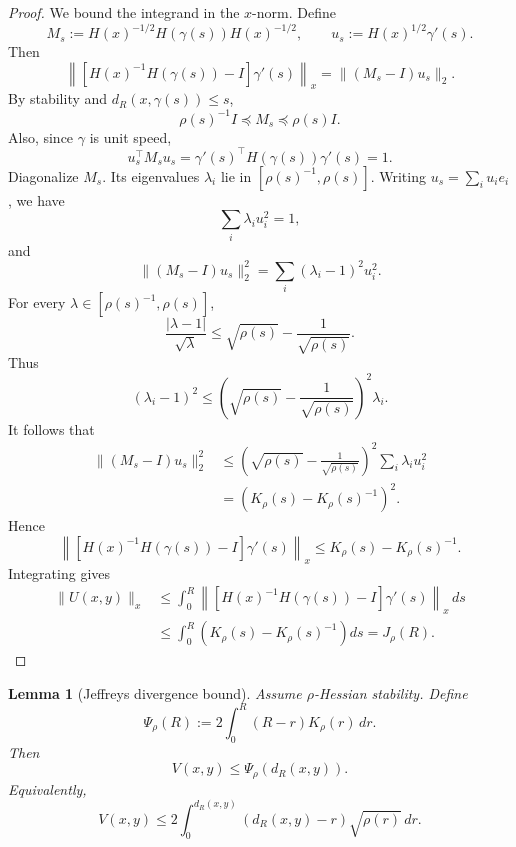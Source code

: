 \documentclass[11pt]{article}
\newtheorem{lemma}{Lemma}
\begin{document}
\begin{proof}
We bound the integrand in the \(x\)-norm. Define
\[
    M_s:=H(x)^{-1/2}H(\gamma(s))H(x)^{-1/2},
    \qquad
    u_s:=H(x)^{1/2}\gamma'(s).
\]
Then
\[
    \left\|
    \left[H(x)^{-1}H(\gamma(s))-I\right]\gamma'(s)
    \right\|_x
    =
    \|(M_s-I)u_s\|_2.
\]
By stability and \(d_R(x,\gamma(s))\le s\),
\[
    \rho(s)^{-1}I\preceq M_s\preceq \rho(s)I.
\]
Also, since \(\gamma\) is unit speed,
\[
    u_s^\top M_su_s
    =
    \gamma'(s)^\top H(\gamma(s))\gamma'(s)
    =1.
\]
Diagonalize \(M_s\). Its eigenvalues \(\lambda_i\) lie in \([\rho(s)^{-1},\rho(s)]\). Writing \(u_s=\sum_i u_i e_i\), we have
\[
    \sum_i\lambda_i u_i^2=1,
\]
and
\[
    \|(M_s-I)u_s\|_2^2
    =
    \sum_i(\lambda_i-1)^2u_i^2.
\]
For every \(\lambda\in[\rho(s)^{-1},\rho(s)]\),
\[
    \frac{|\lambda-1|}{\sqrt\lambda}
    \le
    \sqrt{\rho(s)}-\frac{1}{\sqrt{\rho(s)}}.
\]
Thus
\[
    (\lambda_i-1)^2
    \le
    \left(
        \sqrt{\rho(s)}-\frac{1}{\sqrt{\rho(s)}}
    \right)^2\lambda_i.
\]
It follows that
\[
\begin{aligned}
    \|(M_s-I)u_s\|_2^2
    &\le
    \left(
        \sqrt{\rho(s)}-\frac{1}{\sqrt{\rho(s)}}
    \right)^2
    \sum_i\lambda_i u_i^2 \\
    &=
    \left(K_\rho(s)-K_\rho(s)^{-1}\right)^2.
\end{aligned}
\]
Hence
\[
    \left\|
    \left[H(x)^{-1}H(\gamma(s))-I\right]\gamma'(s)
    \right\|_x
    \le
    K_\rho(s)-K_\rho(s)^{-1}.
\]
Integrating gives
\[
\begin{aligned}
    \|U(x,y)\|_x
    &\le
    \int_0^R
    \left\|
    \left[H(x)^{-1}H(\gamma(s))-I\right]\gamma'(s)
    \right\|_x\,ds \\
    &\le
    \int_0^R\left(K_\rho(s)-K_\rho(s)^{-1}\right)ds
    =J_\rho(R).
\end{aligned}
\]
\end{proof}

\begin{lemma}[Jeffreys divergence bound]\label{lem:V-bound}
Assume \(\rho\)-Hessian stability. Define
\[
    \Psi_\rho(R):=
    2\int_0^R (R-r)K_\rho(r)\,dr.
\]
Then
\[
    V(x,y)
    \le
    \Psi_\rho(d_R(x,y)).
\]
Equivalently,
\[
    V(x,y)
    \le
    2\int_0^{d_R(x,y)}
    \left(d_R(x,y)-r\right)\sqrt{\rho(r)}\,dr.
\]
\end{lemma}
\end{document}
